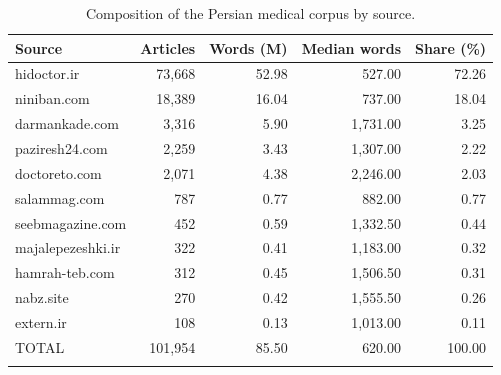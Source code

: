 \begin{table}[h]
\caption{Composition of the Persian medical corpus by source.}\label{tab:corpus_sources}
\begin{tabular}{@{}lrrrr@{}}
\toprule
Source & Articles & Words (M) & Median words & Share (\%) \\
\midrule
hidoctor.ir & 73,668 & 52.98 & 527.00 & 72.26 \\
niniban.com & 18,389 & 16.04 & 737.00 & 18.04 \\
darmankade.com & 3,316 & 5.90 & 1,731.00 & 3.25 \\
paziresh24.com & 2,259 & 3.43 & 1,307.00 & 2.22 \\
doctoreto.com & 2,071 & 4.38 & 2,246.00 & 2.03 \\
salammag.com & 787 & 0.77 & 882.00 & 0.77 \\
seebmagazine.com & 452 & 0.59 & 1,332.50 & 0.44 \\
majalepezeshki.ir & 322 & 0.41 & 1,183.00 & 0.32 \\
hamrah-teb.com & 312 & 0.45 & 1,506.50 & 0.31 \\
nabz.site & 270 & 0.42 & 1,555.50 & 0.26 \\
extern.ir & 108 & 0.13 & 1,013.00 & 0.11 \\
TOTAL & 101,954 & 85.50 & 620.00 & 100.00 \\
\botrule
\end{tabular}
\end{table}
